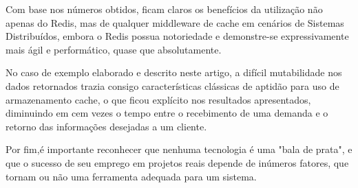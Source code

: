 \documentclass[12pt]{article}
\begin{document}
Com base nos números obtidos, ficam claros os benefícios da utilização não apenas do Redis, mas de qualquer middleware de cache em cenários de Sistemas Distribuídos, embora o Redis possua notoriedade e demonstre-se expressivamente mais ágil e performático, quase que absolutamente.

No caso de exemplo elaborado e descrito neste artigo, a difícil mutabilidade nos dados retornados trazia consigo características clássicas de aptidão para uso de armazenamento cache, o que ficou explícito nos resultados apresentados, diminuindo em cem vezes o tempo entre o recebimento de uma demanda e o retorno das informações desejadas a um cliente.

Por fim,é importante reconhecer que nenhuma tecnologia é uma "bala de prata", e que o sucesso de seu emprego em projetos reais depende de inúmeros fatores, que tornam ou não uma ferramenta adequada para um sistema. 
\end{document}
